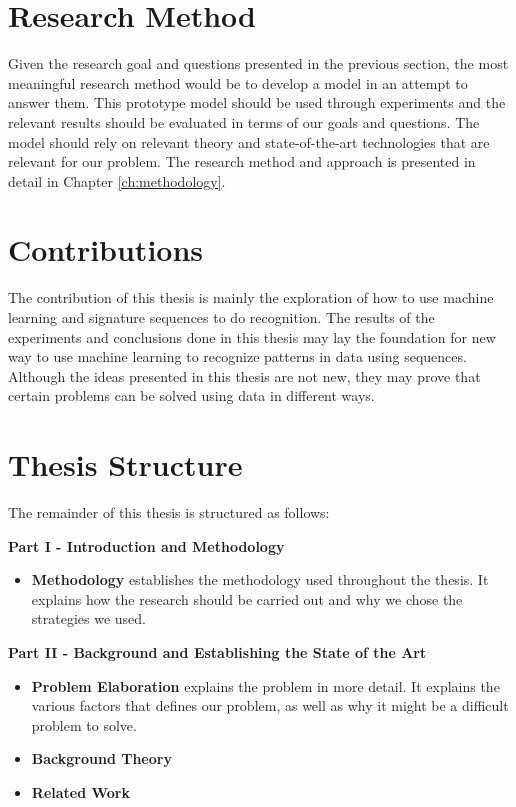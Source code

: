 \section{Research Method}
Given the research goal and questions presented in the previous section, the most meaningful research method would be to develop a model in an attempt to answer them. This prototype model should be used through experiments and the relevant results should be evaluated in terms of our goals and questions. The model should rely on relevant theory and state-of-the-art technologies that are relevant for our problem. The research method and approach is presented in detail in Chapter \ref{ch:methodology}.


\section{Contributions}
The contribution of this thesis is mainly the exploration of how to use machine learning and signature sequences to do recognition. The results of the experiments and conclusions done in this thesis may lay the foundation for new way to use machine learning to recognize patterns in data using sequences. Although the ideas presented in this thesis are not new, they may prove that certain problems can be solved using data in different ways.


\section{Thesis Structure}
The remainder of this thesis is structured as follows:

\vspace{0.5cm}\noindent
\begin{minipage}{\linewidth}
    \textbf{Part I - Introduction and Methodology}
    \begin{itemize}
        \item\textbf{Methodology} establishes the methodology used throughout the thesis. It explains how the research should be carried out and why we chose the strategies we used.
    \end{itemize}
\end{minipage}

\vspace{0.5cm}\noindent
\begin{minipage}{\linewidth}
    \textbf{Part II - Background and Establishing the State of the Art}
    \begin{itemize}
        \item\textbf{Problem Elaboration} explains the problem in more detail. It explains the various factors that defines our problem, as well as why it might be a difficult problem to solve.
        \item\textbf{Background Theory} 
        \item\textbf{Related Work} 
    \end{itemize}
\end{minipage}


